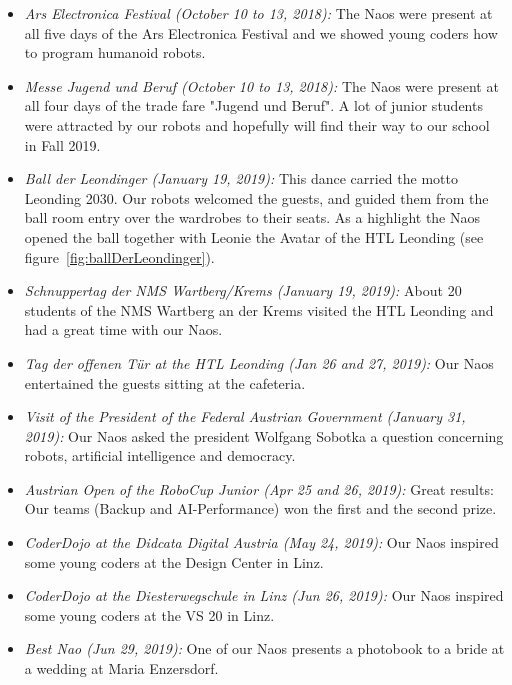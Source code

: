 \documentclass[11pt]{article}
\begin{document}
\begin{itemize}
	\item {\em Ars Electronica Festival (October 10 to 13, 2018):} The Naos were present at all five days of the Ars Electronica Festival and we showed young coders how to program humanoid robots.
	
	\item {\em Messe Jugend und Beruf (October 10 to 13, 2018):}  The Naos were present at all four days of the trade fare "Jugend und Beruf". A lot of junior students were attracted by our robots and hopefully will find their way to our school in Fall 2019.
	
	\item  {\em Ball der Leondinger (January 19, 2019):}  This dance carried the motto Leonding 2030. Our robots welcomed the guests, and guided them from the ball room entry over the wardrobes to their seats. As a highlight the Naos opened the ball together with Leonie the Avatar of the HTL Leonding (see figure~\ref{fig:ballDerLeondinger}).

	\item  {\em Schnuppertag der NMS Wartberg/Krems (January 19, 2019):}  About 20 students of the NMS Wartberg an der Krems visited the HTL Leonding and had a great time with our Naos.

	\item {\em Tag der offenen Tür at the HTL Leonding (Jan 26 and 27, 2019):}  Our Naos entertained the guests sitting at the cafeteria.
	
	\item  {\em Visit of the President of the Federal Austrian Government (January 31, 2019):}  Our Naos asked the president Wolfgang Sobotka a question concerning robots, artificial intelligence and democracy.
	
	\item {\em Austrian Open of the RoboCup Junior (Apr 25 and 26, 2019):}  Great results: Our teams (Backup and AI-Performance) won the first and the second prize.

	\item  {\em CoderDojo at the Didcata Digital Austria (May 24, 2019):}  Our Naos inspired some young coders at the Design Center in Linz.

	\item  {\em CoderDojo at the Diesterwegschule in Linz (Jun 26, 2019):}  Our Naos inspired some young coders at the VS 20 in Linz.

	\item  {\em Best Nao (Jun 29, 2019):}  One of our Naos presents a photobook to a bride at a wedding at Maria Enzersdorf.


\end{itemize}
\end{document}
